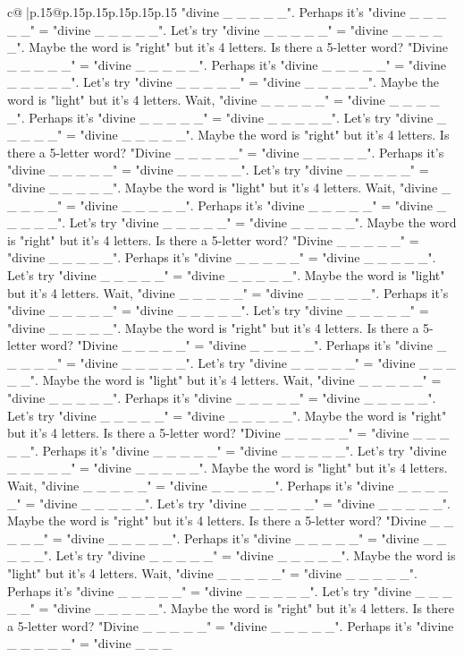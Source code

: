 \documentclass{article}
\begin{document}
{\begin{supertabular}{c@{$\;$}|p{.15\linewidth}@{}p{.15\linewidth}p{.15\linewidth}p{.15\linewidth}p{.15\linewidth}p{.15\linewidth}}
{{{"divine \_ \_ \_ \_ \_". Perhaps it's "divine \_ \_ \_ \_ \_" = "divine \_ \_ \_ \_ \_". Let's try "divine \_ \_ \_ \_ \_" = "divine \_ \_ \_ \_ \_". Maybe the word is "right" but it's 4 letters. Is there a 5{-}letter word? "Divine \_ \_ \_ \_ \_" = "divine \_ \_ \_ \_ \_". Perhaps it's "divine \_ \_ \_ \_ \_" = "divine \_ \_ \_ \_ \_". Let's try "divine \_ \_ \_ \_ \_" = "divine \_ \_ \_ \_ \_". Maybe the word is "light" but it's 4 letters. Wait, "divine \_ \_ \_ \_ \_" = "divine \_ \_ \_ \_ \_". Perhaps it's "divine \_ \_ \_ \_ \_" = "divine \_ \_ \_ \_ \_". Let's try "divine \_ \_ \_ \_ \_" = "divine \_ \_ \_ \_ \_". Maybe the word is "right" but it's 4 letters. Is there a 5{-}letter word? "Divine \_ \_ \_ \_ \_" = "divine \_ \_ \_ \_ \_". Perhaps it's "divine \_ \_ \_ \_ \_" = "divine \_ \_ \_ \_ \_". Let's try "divine \_ \_ \_ \_ \_" = "divine \_ \_ \_ \_ \_". Maybe the word is "light" but it's 4 letters. Wait, "divine \_ \_ \_ \_ \_" = "divine \_ \_ \_ \_ \_". Perhaps it's "divine \_ \_ \_ \_ \_" = "divine \_ \_ \_ \_ \_". Let's try "divine \_ \_ \_ \_ \_" = "divine \_ \_ \_ \_ \_". Maybe the word is "right" but it's 4 letters. Is there a 5{-}letter word? "Divine \_ \_ \_ \_ \_" = "divine \_ \_ \_ \_ \_". Perhaps it's "divine \_ \_ \_ \_ \_" = "divine \_ \_ \_ \_ \_". Let's try "divine \_ \_ \_ \_ \_" = "divine \_ \_ \_ \_ \_". Maybe the word is "light" but it's 4 letters. Wait, "divine \_ \_ \_ \_ \_" = "divine \_ \_ \_ \_ \_". Perhaps it's "divine \_ \_ \_ \_ \_" = "divine \_ \_ \_ \_ \_". Let's try "divine \_ \_ \_ \_ \_" = "divine \_ \_ \_ \_ \_". Maybe the word is "right" but it's 4 letters. Is there a 5{-}letter word? "Divine \_ \_ \_ \_ \_" = "divine \_ \_ \_ \_ \_". Perhaps it's "divine \_ \_ \_ \_ \_" = "divine \_ \_ \_ \_ \_". Let's try "divine \_ \_ \_ \_ \_" = "divine \_ \_ \_ \_ \_". Maybe the word is "light" but it's 4 letters. Wait, "divine \_ \_ \_ \_ \_" = "divine \_ \_ \_ \_ \_". Perhaps it's "divine \_ \_ \_ \_ \_" = "divine \_ \_ \_ \_ \_". Let's try "divine \_ \_ \_ \_ \_" = "divine \_ \_ \_ \_ \_". Maybe the word is "right" but it's 4 letters. Is there a 5{-}letter word? "Divine \_ \_ \_ \_ \_" = "divine \_ \_ \_ \_ \_". Perhaps it's "divine \_ \_ \_ \_ \_" = "divine \_ \_ \_ \_ \_". Let's try "divine \_ \_ \_ \_ \_" = "divine \_ \_ \_ \_ \_". Maybe the word is "light" but it's 4 letters. Wait, "divine \_ \_ \_ \_ \_" = "divine \_ \_ \_ \_ \_". Perhaps it's "divine \_ \_ \_ \_ \_" = "divine \_ \_ \_ \_ \_". Let's try "divine \_ \_ \_ \_ \_" = "divine \_ \_ \_ \_ \_". Maybe the word is "right" but it's 4 letters. Is there a 5{-}letter word? "Divine \_ \_ \_ \_ \_" = "divine \_ \_ \_ \_ \_". Perhaps it's "divine \_ \_ \_ \_ \_" = "divine \_ \_ \_ \_ \_". Let's try "divine \_ \_ \_ \_ \_" = "divine \_ \_ \_ \_ \_". Maybe the word is "light" but it's 4 letters. Wait, "divine \_ \_ \_ \_ \_" = "divine \_ \_ \_ \_ \_". Perhaps it's "divine \_ \_ \_ \_ \_" = "divine \_ \_ \_ \_ \_". Let's try "divine \_ \_ \_ \_ \_" = "divine \_ \_ \_ \_ \_". Maybe the word is "right" but it's 4 letters. Is there a 5{-}letter word? "Divine \_ \_ \_ \_ \_" = "divine \_ \_ \_ \_ \_". Perhaps it's "divine \_ \_ \_ \_ \_" = "divine \_ \_ \_ }}}
\end{supertabular}}
\end{document}
